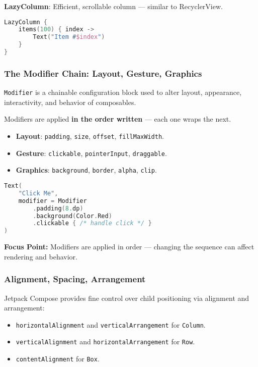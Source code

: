 \documentclass[a4paper,12pt]{article}
\begin{document}
\textbf{LazyColumn}: Efficient, scrollable column — similar to RecyclerView.

\begin{lstlisting}[language=Kotlin]
LazyColumn {
    items(100) { index ->
        Text("Item #$index")
    }
}
\end{lstlisting}

\subsubsection{The Modifier Chain: Layout, Gesture, Graphics}

\texttt{Modifier} is a chainable configuration block used to alter layout, appearance, interactivity, and behavior of composables.

Modifiers are applied \textbf{in the order written} — each one wraps the next.

\begin{itemize}
    \item \textbf{Layout}: \texttt{padding}, \texttt{size}, \texttt{offset}, \texttt{fillMaxWidth}.
    \item \textbf{Gesture}: \texttt{clickable}, \texttt{pointerInput}, \texttt{draggable}.
    \item \textbf{Graphics}: \texttt{background}, \texttt{border}, \texttt{alpha}, \texttt{clip}.
\end{itemize}

\begin{lstlisting}[language=Kotlin]
Text(
    "Click Me",
    modifier = Modifier
        .padding(8.dp)
        .background(Color.Red)
        .clickable { /* handle click */ }
)
\end{lstlisting}

\textbf{Focus Point:} Modifiers are applied in order — changing the sequence can affect rendering and behavior.

\subsubsection{Alignment, Spacing, Arrangement}

Jetpack Compose provides fine control over child positioning via alignment and arrangement:

\begin{itemize}
    \item \texttt{horizontalAlignment} and \texttt{verticalArrangement} for \texttt{Column}.
    \item \texttt{verticalAlignment} and \texttt{horizontalArrangement} for \texttt{Row}.
    \item \texttt{contentAlignment} for \texttt{Box}.
\end{itemize}
\end{document}
